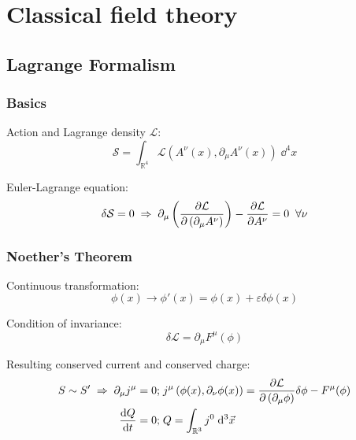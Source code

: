 \section{Classical field theory}
	\subsection{Lagrange Formalism}
		\subsubsection{Basics}
			\noindent
			Action and Lagrange density $\mathcal{L}$:
			\begin{equation}
				\mathcal{S} = \int_{\mathbb{R}^4} \mathcal{L}(A^\nu(x),\partial_\mu A^\nu(x)) \;\dd^4 x
			\end{equation}

			\noindent
			Euler-Lagrange equation:
			\begin{equation}
				\delta\mathcal{S} = 0
				\;\Rightarrow\; \partial_\mu \left(\frac{\partial \mathcal{L}}{\partial \left(\partial_\mu A^\nu\right)}\right) - \frac{\partial \mathcal{L}}{\partial A^\nu} = 0 \;\;\forall \nu
			\end{equation}

		\subsubsection{Noether's Theorem}
			\noindent
			Continuous transformation:%
			\begin{equation}
				\phi(x)\rightarrow\phi'(x) = \phi(x) + \varepsilon \delta \phi(x)
			\end{equation}

			\noindent
			Condition of invariance:%
			\begin{equation}
				\delta\mathcal{L} = \partial_\mu F^\mu(\phi)
			\end{equation}

			\noindent
			Resulting conserved current and conserved charge:%
			\begin{equation}
				\begin{aligned}
					S \sim S' \;\Rightarrow\;\partial_\mu j^\mu = 0;&\; j^\mu \left( \phi(x), \partial_\nu\phi(x) \right) = \frac{\partial \mathcal{L}}{\partial \left(\partial_\mu \phi\right)}\delta\phi - F^\mu(\phi) \\
					\frac{\dd Q}{\dd t} = 0;&\; Q = \int_{\mathbb{R}^3} j^0\;\dd^3\vec{x}
				\end{aligned}
			\end{equation}
